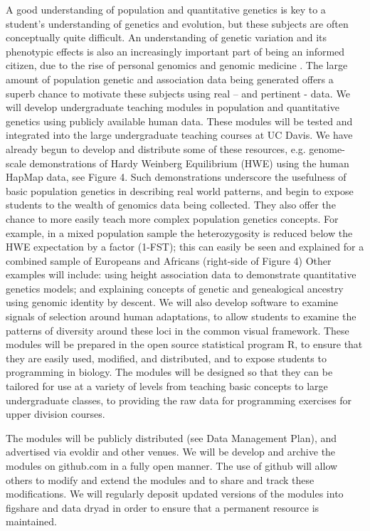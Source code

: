 A good understanding of population and quantitative genetics is key to a student’s understanding of genetics and evolution, but these subjects are often conceptually quite difficult. An understanding of genetic variation and its phenotypic effects is also an increasingly important part of being an informed citizen, due to the rise of personal genomics and genomic medicine \citep[e.g.][]{redfield2012}. The large amount of population genetic and association data being generated offers a superb chance to motivate these subjects using real – and pertinent - data. 
We will develop undergraduate teaching modules in population and quantitative genetics using publicly available human data. These modules will be tested and integrated into the large undergraduate teaching courses at UC Davis. We have already begun to develop and distribute some of these resources, e.g. genome-scale demonstrations of Hardy Weinberg Equilibrium (HWE) using the human HapMap data, see Figure 4. Such demonstrations underscore the usefulness of basic population genetics in describing real world patterns, and begin to expose students to the wealth of genomics data being collected. They also offer the chance to more easily teach more complex population genetics concepts. For example, in a mixed population sample the heterozygosity is reduced below the HWE expectation by a factor (1-FST); this can easily be seen and explained for a combined sample of Europeans and Africans (right-side of Figure 4)
Other examples will include: using height association data to demonstrate quantitative genetics models; and explaining concepts of genetic and genealogical ancestry using genomic identity by descent. We will also develop software to examine signals of selection around human adaptations, to allow students to examine the patterns of diversity around these loci in the common visual framework. These modules will be prepared in the open source statistical program R, to ensure that they are easily used, modified, and distributed, and to expose students to programming in biology. The modules will be designed so that they can be tailored for use at a variety of levels from teaching basic concepts to large undergraduate classes, to providing the raw data for programming exercises for upper division courses.

The modules will be publicly distributed (see Data Management Plan), and advertised via evoldir and other venues. We will be develop and archive the modules on github.com in a fully open manner. The use of github will allow others to modify and extend the modules and to share and track these modifications. We will regularly deposit updated versions of the modules into figshare and data dryad in order to ensure that a permanent resource is maintained. 

